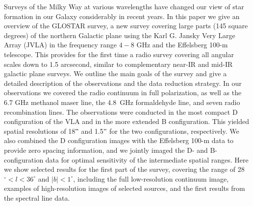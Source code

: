 \documentclass{aa}
\begin{document}
 
  \abstract
   {}
   {Surveys of the Milky Way at various wavelengths have changed our view of star formation in our Galaxy considerably in recent years. In this paper we give an overview of the GLOSTAR survey, a new survey covering large parts (145 square degrees) of the northern Galactic plane using the Karl G. Jansky Very Large Array (JVLA) in the frequency range  $4-8$ GHz and the Effelsberg 100-m telescope. This provides for the first time a radio survey covering all angular scales down to 1.5 arcsecond, similar to complementary near-IR and mid-IR galactic plane surveys. We outline the main goals of the survey and give a detailed description of the observations and the data reduction strategy.}
   {In our observations we covered the radio continuum in full polarization, as well as the 6.7 GHz methanol maser line, the 4.8~GHz formaldehyde line, and seven radio recombination lines. The observations were conducted in the most compact D configuration of the VLA and in the more extended B configuration. This yielded spatial resolutions of 18$"$ and 1.5$"$ for the two configurations, respectively. We also combined the D configuration images with the Effelsberg 100-m data to provide zero spacing information, and we jointly imaged the D- and B-configuration data for optimal sensitivity of the intermediate spatial ranges.}
   {Here we show selected results for the first part of the survey, covering the range of 28$^\circ<l<36^\circ$ and $|b|< 1^\circ$, including the full low-resolution continuum image, examples of high-resolution images of selected sources, and the first results from the spectral line data.
}
   {}


   \maketitle
%
\end{document}
